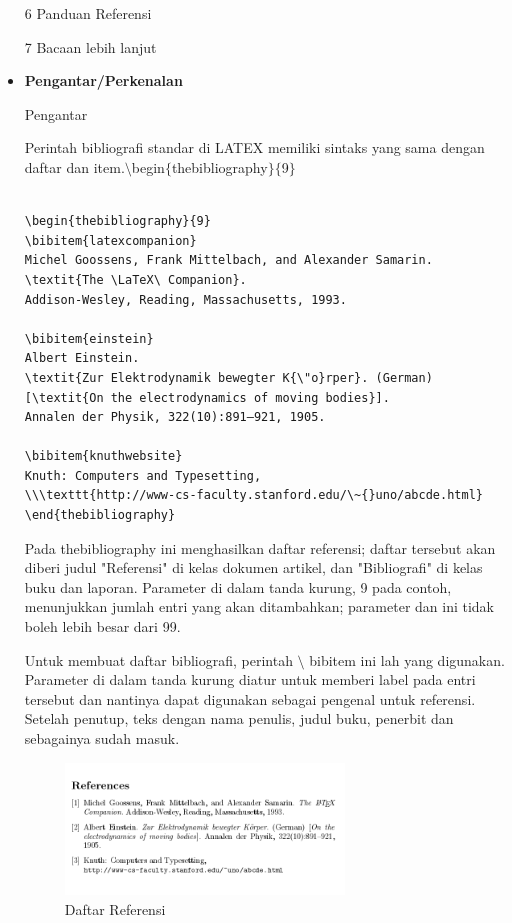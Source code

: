 \begin{itemize}
\noindent \hspace*{0.5in}6 Panduan Referensi\par


\noindent \hspace*{0.5in}7 Bacaan lebih lanjut\par
\vspace{\baselineskip}
\vspace{12pt}
	\item {\fontsize{14pt}{14pt}\selectfont \textbf{Pengantar/Perkenalan}}\par
\vspace{\baselineskip}
Pengantar\par
Perintah bibliografi standar di LATEX memiliki sintaks yang sama dengan daftar dan item.$\setminus$begin$ \{ $thebibliography$ \} $$ \{ $9$ \} $\par
\begin{verbatim}

\begin{thebibliography}{9}
\bibitem{latexcompanion} 
Michel Goossens, Frank Mittelbach, and Alexander Samarin. 
\textit{The \LaTeX\ Companion}. 
Addison-Wesley, Reading, Massachusetts, 1993.

\bibitem{einstein} 
Albert Einstein. 
\textit{Zur Elektrodynamik bewegter K{\"o}rper}. (German) 
[\textit{On the electrodynamics of moving bodies}]. 
Annalen der Physik, 322(10):891–921, 1905.

\bibitem{knuthwebsite} 
Knuth: Computers and Typesetting,
\\\texttt{http://www-cs-faculty.stanford.edu/\~{}uno/abcde.html}
\end{thebibliography}
\end{verbatim}


Pada thebibliography ini menghasilkan daftar referensi; daftar tersebut akan diberi judul "Referensi" di kelas dokumen artikel, dan "Bibliografi" di kelas buku dan laporan. Parameter di dalam tanda kurung, 9 pada contoh, menunjukkan jumlah entri yang akan ditambahkan; parameter dan ini tidak boleh lebih besar dari 99.\par
Untuk membuat daftar bibliografi, perintah $\setminus$ bibitem ini lah yang digunakan. Parameter di dalam tanda kurung diatur untuk memberi label pada entri tersebut dan nantinya dapat digunakan sebagai pengenal untuk referensi. Setelah penutup, teks dengan nama penulis, judul buku, penerbit dan sebagainya sudah masuk.\par

\begin{figure}[ht]
	\centerline{\includegraphics[width=0.70\textwidth]{gambar/Adding}}
	\caption{Daftar Referensi}
	\label{Daftar Referensi}
\end{figure}


\end{itemize}
